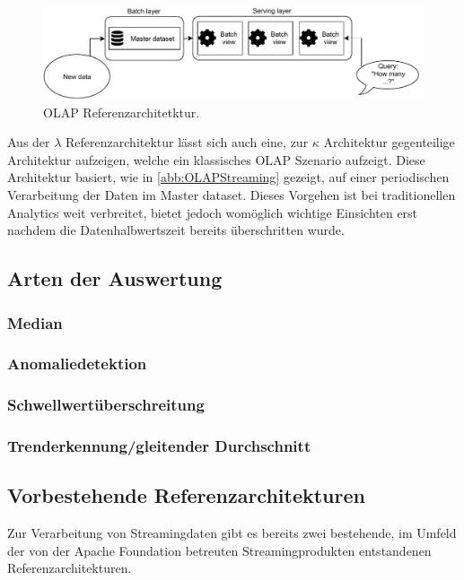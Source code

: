 


\begin{figure}[H]
\centering
\includegraphics[width=\textwidth]{graphics/OLAP-Reference-Architecture.pdf}
\caption[OLAP Referenzarchitetktur]{OLAP Referenzarchitetktur.\footnotemark}
\label{abb:OLAPStreaming}
\end{figure}

Aus der $\lambda$ Referenzarchitektur lässt sich auch eine, zur $\kappa$ Architektur gegenteilige Architektur aufzeigen, welche ein klassisches \ac{OLAP} Szenario aufzeigt.  Diese Architektur basiert, wie in \autoref{abb:OLAPStreaming} gezeigt, auf einer periodischen Verarbeitung der Daten im Master dataset. Dieses Vorgehen ist bei traditionellen Analytics weit verbreitet, bietet jedoch womöglich wichtige Einsichten erst nachdem die Datenhalbwertszeit bereits überschritten wurde.


\subsection{Arten der Auswertung}
\subsubsection{Median}
\subsubsection{Anomaliedetektion}
\subsubsection{Schwellwertüberschreitung}
\subsubsection{Trenderkennung/gleitender Durchschnitt}

\subsection{Vorbestehende Referenzarchitekturen}
Zur Verarbeitung von Streamingdaten gibt es bereits zwei bestehende, im Umfeld der von der Apache Foundation betreuten Streamingprodukten entstandenen Referenzarchitekturen. 



